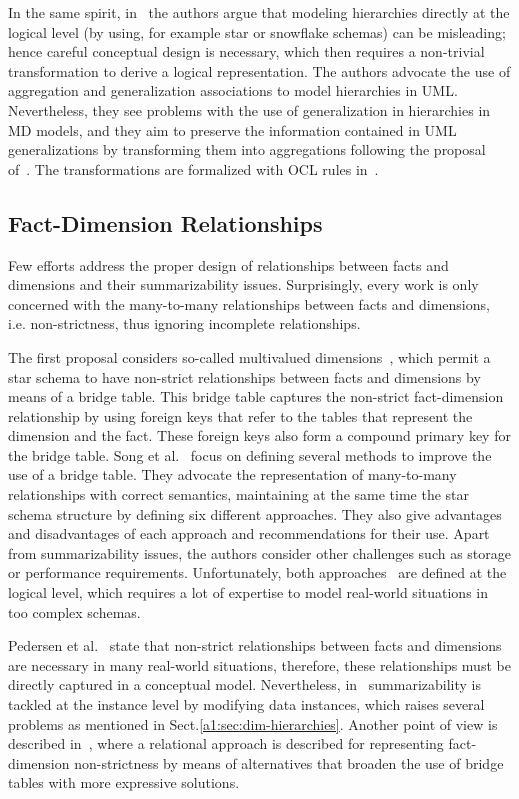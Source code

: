 In the same spirit, in~\cite{DBLP:conf/er/AkokaCP01} the authors
argue that modeling hierarchies directly at the logical level (by
using, for example star or snowflake schemas) can be misleading;
hence careful conceptual design is necessary, which then requires a
non-trivial transformation to derive a logical representation. The
authors advocate the use of aggregation and generalization
associations to model hierarchies in UML. Nevertheless, they see
problems with the use of generalization in hierarchies in MD models,
and they aim to preserve the information contained in UML
generalizations by transforming them into aggregations following the
proposal of~\cite{DBLP:conf/dmdw/MoodyK00}. The transformations are
formalized with OCL rules in~\cite{DBLP:journals/dss/PratAC06}.


\subsection{Fact-Dimension Relationships}
Few efforts address the proper design of relationships between facts
and dimensions and their summarizability issues. Surprisingly, every
work is only concerned with the many-to-many relationships between
facts and dimensions, i.e. non-strictness, thus ignoring incomplete
relationships.

The first proposal considers so-called multivalued
dimensions~\cite{book/Kimball/DW}, which permit a star schema to
have non-strict relationships between facts and dimensions by means
of a bridge table. This bridge table captures the non-strict
fact-dimension relationship by using foreign keys that refer to the
tables that represent the dimension and the fact. These foreign keys
also form a compound primary key for the bridge table. Song et
al.~\cite{DBLP:conf/dmdw/SongRME01} focus on defining several
methods to improve the use of a bridge table. They advocate the
representation of many-to-many relationships with correct semantics,
maintaining at the same time the star schema structure by defining
six different approaches. They also give advantages and
disadvantages of each approach and recommendations for their use.
Apart from summarizability issues, the authors consider other
challenges such as storage or performance requirements.
Unfortunately, both
approaches~\cite{book/Kimball/DW,DBLP:conf/dmdw/SongRME01} are
defined at the logical level, which requires a lot of expertise to
model real-world situations in too complex schemas.

Pedersen et
al.~\cite{DBLP:journals/is/PedersenJD01,DBLP:conf/vldb/PedersenJD99}
state that non-strict relationships between facts and dimensions are
necessary in many real-world situations, therefore, these
relationships must be directly captured in a conceptual model.
Nevertheless, in~\cite{DBLP:conf/vldb/PedersenJD99} summarizability
is tackled at the instance level by modifying data instances, which
raises several problems as mentioned in
Sect.\ref{a1:sec:dim-hierarchies}. Another point of view is
described in~\cite{DBLP:journals/is/PedersenJD01}, where a
relational approach is described for representing fact-dimension
non-strict\-ness by means of alternatives that broaden the use of
bridge tables with more expressive solutions.


